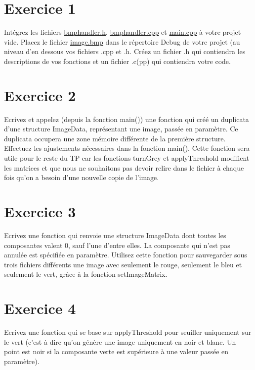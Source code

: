 \documentclass[10pt,twocolumn]{article}
\begin{document}
\section{Exercice 1}
Intégrez les fichiers \href{http://c.x-cli.com/bmphandler.h}{bmphandler.h}, \href{http://c.x-cli.com/bmphandler.cpp}{bmphandler.cpp} et \href{http://c.x-cli.com/tp6main2011.cpp}{main.cpp} à votre projet vide.
Placez le fichier \href{http://c.x-cli.com/image.jpg}{image.bmp} dans le répertoire Debug de votre projet (au niveau d'en dessous vos fichiers .cpp et .h.
Créez un fichier .h qui contiendra les descriptions de vos fonctions et un fichier .c(pp) qui contiendra votre code.

\section{Exercice 2}
Ecrivez et appelez (depuis la fonction main()) une fonction qui créé un duplicata d'une structure ImageData, représentant une image, passée en paramètre. Ce duplicata occupera une zone mémoire différente de la première structure. Effectuez les ajustements nécessaires dans la fonction main().
Cette fonction sera utile pour le reste du TP car les fonctions turnGrey et applyThreshold modifient les matrices et que nous ne souhaitons pas devoir relire dans le fichier à chaque fois qu'on a besoin d'une nouvelle copie de l'image.

\section{Exercice 3}
Ecrivez une fonction qui renvoie une structure ImageData dont toutes les composantes valent 0, sauf l'une d'entre elles. La composante qui n'est pas annulée est spécifiée en paramètre.
Utilisez cette fonction pour sauvegarder sous trois fichiers différents une image avec seulement le rouge, seulement le bleu et seulement le vert, grâce à la fonction setImageMatrix.

\section{Exercice 4}
Ecrivez une fonction qui se base sur applyThreshold pour seuiller uniquement sur le vert (c'est à dire qu'on génère une image uniquement en noir et blanc. Un point est noir si la composante verte est supérieure à une valeur passée en paramètre).
\end{document}

